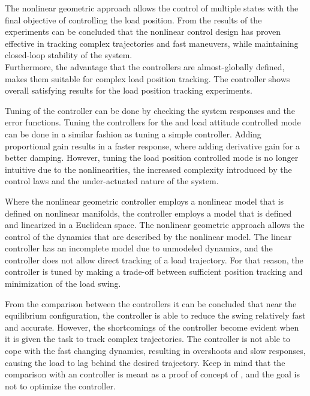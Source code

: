 
The nonlinear geometric approach allows the control of multiple states with the final objective of controlling the load position.
From the results of the experiments can be concluded that the nonlinear control design has proven effective in tracking complex trajectories and fast maneuvers,
while maintaining closed-loop stability of the system. \\
Furthermore, the advantage that the controllers are almost-globally defined, makes them suitable for complex load position tracking.
The controller shows overall satisfying results for the load position tracking experiments. 

Tuning of the controller can be done by checking the system responses and the error functions.
Tuning the controllers for the  and load attitude controlled mode can be done in a similar fashion as tuning a simple  controller. 
Adding proportional gain results in a faster response, where adding derivative gain for a better damping. 
However, tuning the load position controlled mode is no longer intuitive due to the nonlinearities, the increased complexity introduced by the control laws and the under-actuated nature of the system.

Where the nonlinear geometric controller employs a nonlinear model that is defined on nonlinear manifolds,
the  controller employs a model that is defined and linearized in a Euclidean space. 
The nonlinear geometric approach allows the control of the dynamics that are described by the nonlinear model.
The linear controller has an incomplete model due to unmodeled dynamics, and the controller does not allow direct tracking of a load trajectory.
For that reason, the  controller is tuned by making a trade-off between sufficient  position tracking and minimization of the load swing. 

From the comparison between the controllers it can be concluded that near the equilibrium configuration, the  controller is able to reduce the swing relatively fast and accurate.
However, the shortcomings of the  controller become evident when it is given the task to track complex trajectories. 
The controller is not able to cope with the fast changing dynamics, resulting in overshoots and slow responses, causing the load to lag behind the desired trajectory.
Keep in mind that the comparison with an  controller is meant as a proof of concept of , and the goal is not to optimize the  controller. 


